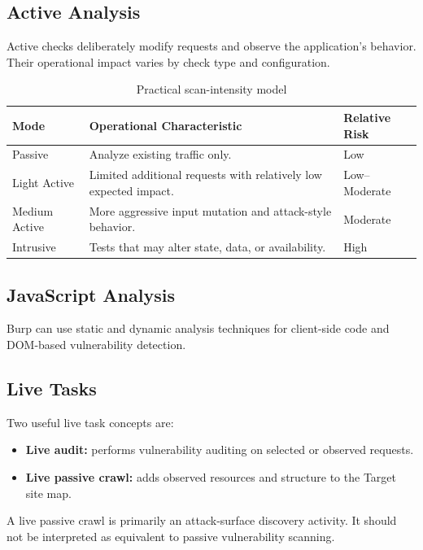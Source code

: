 \documentclass[11pt]{article}
\begin{document}
\subsection{Active Analysis}

Active checks deliberately modify requests and observe the application's behavior. Their operational impact varies by check type and configuration.

\begin{table}[htbp]
\centering
\caption{Practical scan-intensity model}
\begin{tabularx}{\textwidth}{@{}lXl@{}}
\toprule
\textbf{Mode} & \textbf{Operational Characteristic} & \textbf{Relative Risk} \\
\midrule
Passive & Analyze existing traffic only. & Low \\
Light Active & Limited additional requests with relatively low expected impact. & Low--Moderate \\
Medium Active & More aggressive input mutation and attack-style behavior. & Moderate \\
Intrusive & Tests that may alter state, data, or availability. & High \\
\bottomrule
\end{tabularx}
\end{table}

\subsection{JavaScript Analysis}

Burp can use static and dynamic analysis techniques for client-side code and DOM-based vulnerability detection.

\subsection{Live Tasks}

Two useful live task concepts are:

\begin{itemize}
  \item \textbf{Live audit:} performs vulnerability auditing on selected or observed requests.
  \item \textbf{Live passive crawl:} adds observed resources and structure to the Target site map.
\end{itemize}

\begin{warningbox}
A live passive crawl is primarily an attack-surface discovery activity. It should not be interpreted as equivalent to passive vulnerability scanning.
\end{warningbox}
\end{document}
